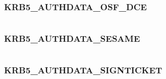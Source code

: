 \documentclass[letterpaper,10pt,english]{sphinxmanual}
\begin{document}
\subsubsection{KRB5\_AUTHDATA\_OSF\_DCE}
\label{appdev/refs/macros/KRB5_AUTHDATA_OSF_DCE:krb5-authdata-osf-dce-data}\label{appdev/refs/macros/KRB5_AUTHDATA_OSF_DCE::doc}\label{appdev/refs/macros/KRB5_AUTHDATA_OSF_DCE:krb5-authdata-osf-dce}

\begin{fulllineitems}
\label{appdev/refs/macros/KRB5_AUTHDATA_OSF_DCE:KRB5_AUTHDATA_OSF_DCE}
\end{fulllineitems}


\begin{tabulary}{\linewidth}{|L|L|}
\hline

 & 
\\\hline
\end{tabulary}



\subsubsection{KRB5\_AUTHDATA\_SESAME}
\label{appdev/refs/macros/KRB5_AUTHDATA_SESAME:krb5-authdata-sesame}\label{appdev/refs/macros/KRB5_AUTHDATA_SESAME::doc}\label{appdev/refs/macros/KRB5_AUTHDATA_SESAME:krb5-authdata-sesame-data}

\begin{fulllineitems}
\label{appdev/refs/macros/KRB5_AUTHDATA_SESAME:KRB5_AUTHDATA_SESAME}
\end{fulllineitems}


\begin{tabulary}{\linewidth}{|L|L|}
\hline

 & 
\\\hline
\end{tabulary}



\subsubsection{KRB5\_AUTHDATA\_SIGNTICKET}
\label{appdev/refs/macros/KRB5_AUTHDATA_SIGNTICKET:krb5-authdata-signticket-data}\label{appdev/refs/macros/KRB5_AUTHDATA_SIGNTICKET:krb5-authdata-signticket}\label{appdev/refs/macros/KRB5_AUTHDATA_SIGNTICKET::doc}
\end{document}
